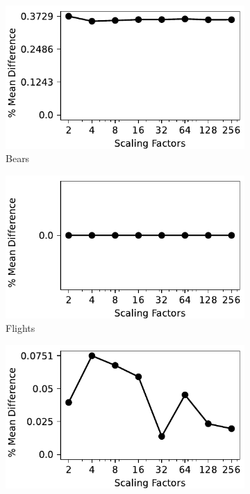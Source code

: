 \begin{figure}[!t]
    \centering 
    \centering
\begin{subfigure}{0.32\textwidth}
    \includegraphics[width=\textwidth]{figures/plot/mean/mean_diff_beers.pdf}
    \caption{Bears}
    \label{exp:mean_bears}
\end{subfigure}
\hfill
\begin{subfigure}{0.32\textwidth}
    \includegraphics[width=\textwidth]{figures/plot/mean/mean_diff_flights.pdf}
    \caption{Flights}
    \label{exp:mean_flights}
\end{subfigure}
\hfill
\begin{subfigure}{0.32\textwidth}
    \includegraphics[width=\textwidth]{figures/plot/mean/mean_diff_hospital.pdf}

\end{subfigure}
\end{figure}

